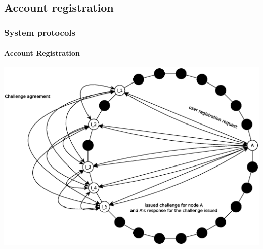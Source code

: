 \subsection{Account registration}
\begin{frame}
\frametitle{System protocols}
\framesubtitle{Account Registration}
\includegraphics[height=0.7\textheight]{../../img/sign_up}\\
\end{frame}

